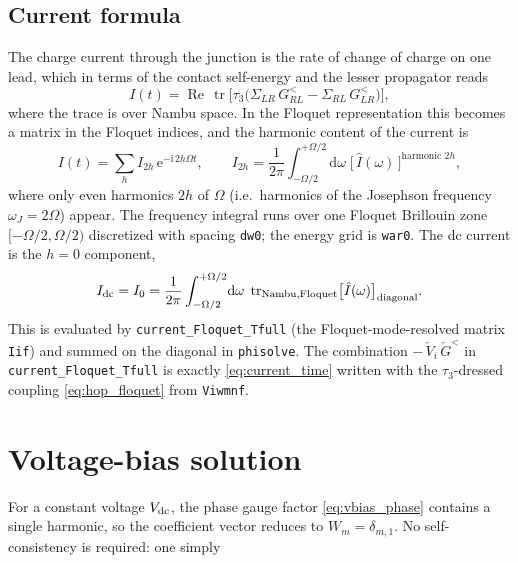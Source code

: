 \documentclass[11pt,a4paper]{article}
\newcommand{\dd}{\mathrm{d}}
\newcommand{\ii}{\mathrm{i}}
\newcommand{\ee}{\mathrm{e}}
\newcommand{\tr}{\operatorname{tr}}
\newcommand{\Real}{\operatorname{Re}}
\newcommand{\Gr}{\check{G}}            %
\newcommand{\tauz}{\tau_3}
\newcommand{\Om}{\Omega}
\newcommand{\Wm}{W}
\begin{document}
\subsection{Current formula}
\label{sec:current}

The charge current through the junction is the rate of change of charge on one
lead, which in terms of the contact self-energy and the lesser propagator reads
\begin{equation}
  I(t) = \Real\,\tr\!\Big[\tauz\big(\Sigma_{LR}\,G^<_{RL}-\Sigma_{RL}\,G^<_{LR}\big)\Big],
  \label{eq:current_time}
\end{equation}
where the trace is over Nambu space.  In the Floquet representation this becomes
a matrix in the Floquet indices, and the harmonic content of the current is
\begin{equation}
  I(t) = \sum_{h} I_{2h}\,\ee^{-\ii\,2h\Om t},
  \qquad
  I_{2h} = \frac{1}{2\pi}\int_{-\Om/2}^{+\Om/2}\!\dd\omega\;
           \big[\,\hat{I}(\omega)\,\big]^{\text{harmonic } 2h},
  \label{eq:current_harmonics}
\end{equation}
where only even harmonics $2h$ of $\Om$ (i.e.\ harmonics of the Josephson
frequency $\omega_J=2\Om$) appear.  The frequency integral runs over one
Floquet Brillouin zone $[-\Om/2,\Om/2)$ discretized with spacing
\texttt{dw0}; the energy grid is \texttt{war0}.  The dc current is the
$h=0$ component,
\begin{equation}
  I_{\rm dc} = I_0 = \frac{1}{2\pi}\int_{-\Om/2}^{+\Om/2}\!\dd\omega\;
               \tr_{\rm Nambu,Floquet}\!\big[\hat{I}(\omega)\big]_{\rm diagonal}.
\end{equation}
This is evaluated by \texttt{current\_Floquet\_Tfull} (the Floquet-mode-resolved matrix
\texttt{Iif}) and summed on the diagonal in \texttt{phisolve}.  The combination
$-\,\check V_i\,\Gr^<$ in \texttt{current\_Floquet\_Tfull} is exactly
\eqref{eq:current_time} written with the $\tauz$-dressed coupling
\eqref{eq:hop_floquet} from \texttt{Viwmnf}.

\section{Voltage-bias solution}
\label{sec:vbias}

For a constant voltage $V_{\rm dc}$, the phase gauge factor
\eqref{eq:vbias_phase} contains a single harmonic, so the coefficient vector
reduces to $\Wm_m=\delta_{m,1}$.  No self-consistency is required: one simply
\end{document}
